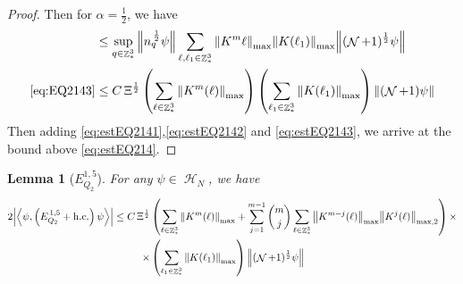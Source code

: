 \documentclass[sn-mathphys, Numbered ,a4paper]{sn-jnl}%
\DeclareMathOperator{\Z}{\mathbb{Z}}
\DeclareMathOperator{\HH}{\mathcal{H}}
\DeclareMathOperator{\NN}{\mathcal{N}}
\newcommand{\half}{\frac{1}{2}}
\newcommand{\eva}[1]{\left\langle #1 \right\rangle}
\theoremstyle{plain}
\newtheorem{lemma}[theorem]{Lemma}
\theoremstyle{definition}
\theoremstyle{remark}
\theoremstyle{plain}
\theoremstyle{definition}
\theoremstyle{remark}
\begin{document}
\begin{proof}
	Then for $\alpha = \half$, we have
	\begin{align}
		&\leq  \sup\limits_{q \in \Z^3_*} \norm{ n_{q}^{\,\half} \psi } \sum\limits_{\ell, \ell_1\in \Z^3_*}  \norm{K^m{\ell}}_{\mathrm{max}} \norm{K(\ell_1)}_{\mathrm{max}} \norm{ (\NN+1)^{\frac{1}{2}} \psi}  \nonumber\\
		\eqref{eq:EQ2143}&\leq C\, \Xi^\half \left(\sum\limits_{\ell\in \Z^3_*} \norm{K^m(\ell)}_{\mathrm{max}}\right)\left(  \sum\limits_{ \ell_1\in \Z^3_*}  \norm{ K(\ell_1)}_{\mathrm{max}} \right) \norm{ (\NN+1) \psi}\label{eq:estEQ2143} 
	\end{align}
	Then adding \eqref{eq:estEQ2141},\eqref{eq:estEQ2142} and \eqref{eq:estEQ2143}, we arrive at the bound above \eqref{eq:estEQ214}.
\end{proof}

\begin{lemma}[$E_{Q_2}^{1,5}$]
    For any $\psi \in \HH_N$, we have
    \begin{align}
    	2\abs{\eva{\psi,\left(E^{\,1,5}_{Q_2}+\mathrm{h.c.}\right) \psi }}
    	\leq  C\, \Xi^\half &\left(\sum\limits_{\ell \in \Z^3_*} \norm{K^m(\ell)}_{\mathrm{max}} +\sum\limits_{j=1}^{m-1} {{m}\choose j} \sum\limits_{\ell \in \Z^3_*} \norm{K^{m-j}(\ell)}_{\mathrm{max}} \norm{ K^{j}(\ell)}_{\mathrm{max},2}\right)\nonumber \times\\ \times&\left( \sum\limits_{\ell_1\in \Z^3_*} \norm{ K(\ell_1)}_{\mathrm{max}} \right) \norm{(\NN+1)^\half\psi}  \label{eq:estEQ215}
    \end{align}
\end{lemma}
\end{document}
